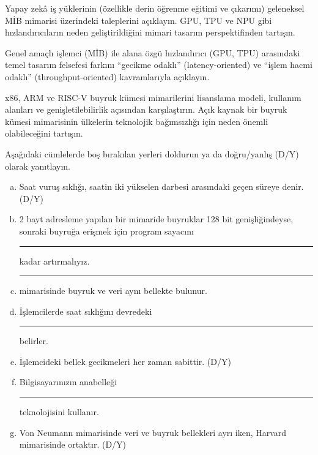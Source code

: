 \begin{alistirma}[\zor]
Yapay zekâ iş yüklerinin (özellikle derin öğrenme eğitimi ve çıkarımı) geleneksel MİB mimarisi üzerindeki taleplerini açıklayın. GPU, TPU ve NPU gibi hızlandırıcıların neden geliştirildiğini mimari tasarım perspektifinden tartışın.
\end{alistirma}

\begin{alistirma}[\orta]
Genel amaçlı işlemci (MİB) ile alana özgü hızlandırıcı (GPU, TPU) arasındaki temel tasarım felsefesi farkını ``gecikme odaklı'' (latency-oriented) ve ``işlem hacmi odaklı'' (throughput-oriented) kavramlarıyla açıklayın.
\end{alistirma}

\begin{alistirma}[\zor]
x86, ARM ve RISC-V buyruk kümesi mimarilerini lisanslama modeli, kullanım alanları ve genişletilebilirlik açısından karşılaştırın. Açık kaynak bir buyruk kümesi mimarisinin ülkelerin teknolojik bağımsızlığı için neden önemli olabileceğini tartışın.
\end{alistirma}


\begin{alistirma}[\kolay]
Aşağıdaki cümlelerde boş bırakılan yerleri doldurun ya da doğru/yanlış (D/Y) olarak yanıtlayın.
\begin{enumerate}[(a)]
    \item Saat vuruş sıklığı, saatin iki yükselen darbesi arasındaki geçen süreye denir. (D/Y)
    \item 2 bayt adresleme yapılan bir mimaride buyruklar 128 bit genişliğindeyse, sonraki buyruğa erişmek için program sayacını \rule{2cm}{0.4pt} kadar artırmalıyız.
    \item \rule{3cm}{0.4pt} mimarisinde buyruk ve veri aynı bellekte bulunur.
    \item İşlemcilerde saat sıklığını devredeki \rule{3cm}{0.4pt} belirler.
    \item İşlemcideki bellek gecikmeleri her zaman sabittir. (D/Y)
    \item Bilgisayarınızın anabelleği \rule{2cm}{0.4pt} teknolojisini kullanır.
    \item Von Neumann mimarisinde veri ve buyruk bellekleri ayrı iken, Harvard mimarisinde ortaktır. (D/Y)
\end{enumerate}
\end{alistirma}

